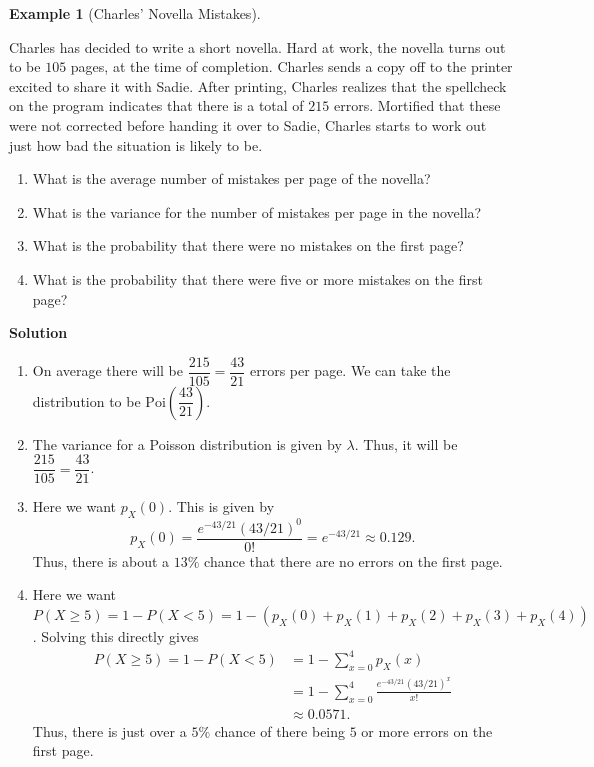 \documentclass[
  letterpaper,
  DIV=11,
  numbers=noendperiod]{scrreprt}
\providecommand{\tightlist}{%
  \setlength{\itemsep}{0pt}\setlength{\parskip}{0pt}}\usepackage{longtable,booktabs,array}
\theoremstyle{definition}
\theoremstyle{definition}
\newtheorem{example}{Example}[chapter]
\theoremstyle{definition}
\theoremstyle{remark}
\begin{document}
\begin{example}[Charles' Novella
Mistakes]\protect\hypertarget{exm-poi-dist}{}\label{exm-poi-dist}

Charles has decided to write a short novella. Hard at work, the novella
turns out to be \(105\) pages, at the time of completion. Charles sends
a copy off to the printer excited to share it with Sadie. After
printing, Charles realizes that the spellcheck on the program indicates
that there is a total of \(215\) errors. Mortified that these were not
corrected before handing it over to Sadie, Charles starts to work out
just how bad the situation is likely to be.

\begin{enumerate}
\def\labelenumi{\alph{enumi}.}
\tightlist
\item
  What is the average number of mistakes per page of the novella?
\item
  What is the variance for the number of mistakes per page in the
  novella?
\item
  What is the probability that there were no mistakes on the first page?
\item
  What is the probability that there were five or more mistakes on the
  first page?
\end{enumerate}

\begin{tcolorbox}[enhanced jigsaw, colback=white, colframe=quarto-callout-color-frame, arc=.35mm, leftrule=.75mm, rightrule=.15mm, opacityback=0, breakable, bottomrule=.15mm, left=2mm, toprule=.15mm]

\vspace{-3mm}\textbf{Solution}\vspace{3mm}

\begin{enumerate}
\def\labelenumi{\alph{enumi}.}
\tightlist
\item
  On average there will be \(\dfrac{215}{105} = \dfrac{43}{21}\) errors
  per page. We can take the distribution to be
  \(\text{Poi}(\dfrac{43}{21})\).
\item
  The variance for a Poisson distribution is given by \(\lambda\). Thus,
  it will be \(\dfrac{215}{105} = \dfrac{43}{21}\).
\item
  Here we want \(p_X(0)\). This is given by
  \[p_X(0) = \frac{e^{-43/21}(43/21)^0}{0!} = e^{-43/21} \approx 0.129.\]
  Thus, there is about a \(13\%\) chance that there are no errors on the
  first page.
\item
  Here we want
  \(P(X \geq 5) = 1 - P(X < 5) = 1 - (p_X(0) + p_X(1) + p_X(2) + p_X(3) + p_X(4))\).
  Solving this directly gives \begin{align*}
   P(X \geq 5) = 1 - P(X < 5) &= 1 - \sum_{x=0}^4 p_X(x) \\
   &= 1 - \sum_{x=0}^4 \frac{e^{-43/21}(43/21)^x}{x!} \\
   &\approx 0.0571.
  \end{align*} Thus, there is just over a \(5\%\) chance of there being
  \(5\) or more errors on the first page.
\end{enumerate}


\end{tcolorbox}
\end{example}
\end{document}
